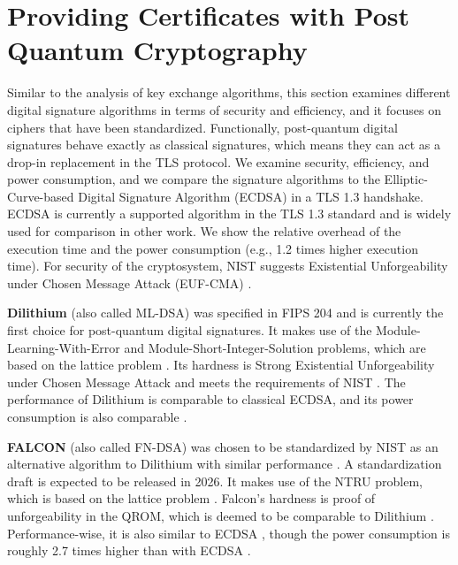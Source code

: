\documentclass[public,noindent]{aisecreport}
\begin{document}
\section{Providing Certificates with Post Quantum Cryptography}

Similar to the analysis of key exchange algorithms, this section examines different digital signature algorithms in terms of security and efficiency, and it focuses on ciphers that have been standardized. Functionally, post-quantum digital signatures behave exactly as classical signatures, which means they can act as a drop-in replacement in the TLS protocol. We examine security, efficiency, and power consumption, and we compare the signature algorithms to the Elliptic-Curve-based Digital Signature Algorithm (ECDSA) in a TLS 1.3 handshake. ECDSA is currently a supported algorithm in the TLS 1.3 standard and is widely used for comparison in other work. We show the relative overhead of the execution time and the power consumption (e.g., 1.2 times higher execution time). For security of the cryptosystem, NIST suggests Existential Unforgeability under Chosen Message Attack (EUF-CMA) \cite{national2016submission}.

\textbf{Dilithium} (also called ML-DSA) was specified in FIPS 204 \cite{unknown-author-2024} and is currently the first choice for post-quantum digital signatures. It makes use of the Module-Learning-With-Error and Module-Short-Integer-Solution problems, which are based on the lattice problem \cite{CRYSTALSDIL}. Its hardness is Strong Existential Unforgeability under Chosen Message Attack and meets the requirements of NIST \cite{CRYSTALSDIL, national2016submission}. The performance of Dilithium is comparable to classical ECDSA, and its power consumption is also comparable \cite{doring2022post, tasopoulos2023energy}.

\textbf{FALCON} (also called FN-DSA) was chosen to be standardized by NIST as an alternative algorithm to Dilithium with similar performance \cite{boutin-2025-2}. A standardization draft is expected to be released in 2026. It makes use of the NTRU problem, which is based on the lattice problem \cite{fouque2020falcon, alnahawi2024comprehensive}. Falcon's hardness is proof of unforgeability in the QROM, which is deemed to be comparable to Dilithium \cite{boneh2011random, alagic2022status}. Performance-wise, it is also similar to ECDSA \cite{doring2022post, alnahawi2024comprehensive}, though the power consumption is roughly 2.7 times higher than with ECDSA \cite{tasopoulos2023energy}.
\end{document}
